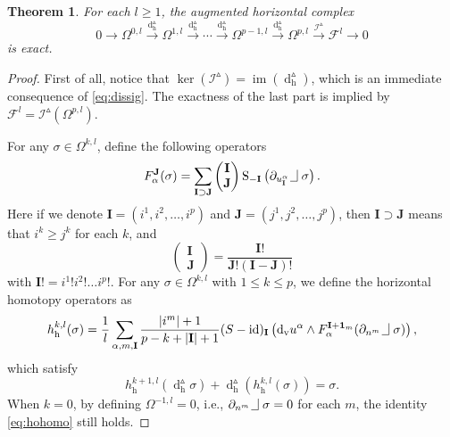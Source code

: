 \documentclass[11pt]{article} %
\numberwithin{equation}{section}
\newcommand{\intpsym}{\,\, \setlength{\unitlength}{0.4mm}
	\begin{picture}(0, 0)(5, 5)%
	\put(0, 4){\line(1,0){5}} \put(5,4){\line(0,1){8}}
	\end{picture}\,\,}
\newcommand{\intp}{\,\,\intpsym}
\newcommand{\es}{\operatorname{S}}
\newcommand{\id}{\operatorname{id}}
\newcommand{\upd}{\operatorname{d}}
\newcommand{\uph}{\operatorname{h}}
\newcommand{\upv}{\operatorname{v}}
\newcommand{\dv}{\upd_{\upv}\!}
\newcommand{\mbI}{\mathbf{I}}
\newcommand{\mbJ}{\mathbf{J}}
\newcommand{\mcI}{\mathcal{I}}
\newcommand{\dDh}{\upd^{\vartriangle}_{\uph}}
\theoremstyle{plain}
\newtheorem{thm}{Theorem}[section]
\theoremstyle{definition}
\begin{document}
\begin{thm}
For each $l\geq1$, the augmented horizontal complex
\begin{equation}
0\rightarrow
\Omega^{0,l}\stackrel{\dDh}{\longrightarrow}
\Omega^{1,l}\stackrel{\dDh}{\longrightarrow}
\cdots\stackrel{\dDh}{\longrightarrow}
\Omega^{p-1,l}\stackrel{\dDh}{\longrightarrow}
\Omega^{p,l}\stackrel{\mcI^{\vartriangle}}{\longrightarrow}
\mathscr{F}^l\rightarrow0 
\end{equation}
is exact.
\end{thm}

\begin{proof}
First of all, notice that $\ker
(\mcI^{\vartriangle})=\operatorname{im}
(\dDh)$, which is an
immediate consequence of \eqref{eq:dissig}. The exactness of the
last part is implied by
$\mathscr{F}^l=\mcI^{\vartriangle}(\Omega^{p,l})$.

For any $\sigma\in\Omega^{k,l}$, define the following operators 
\begin{equation}
F_{\alpha}^{\mbJ}(\sigma)=\sum_{\mbI\supset \mbJ}\begin{pmatrix}
\mbI\\
\mbJ
\end{pmatrix}\es_{-\mbI}\left(\partial_{u_{\mbI}^{\alpha}}\intp\sigma\right).
\end{equation}
Here if we denote $\mbI=(i^1,i^2,\ldots,i^p)$ and $\mbJ=(j^1,j^2,\ldots,j^p)$,
then $\mbI\supset \mbJ$ means that $i^k\geq j^k$ for each $k$, and
\begin{equation}
\begin{pmatrix}
\mbI\\
\mbJ
\end{pmatrix}=\frac{\mbI!}{\mbJ!(\mbI- \mbJ)!}
\end{equation}
 with $\mbI!=i^1!i^2!\ldots i^p!$. 
For any $\sigma\in\Omega^{k,l}$ with $1\leq k\leq p$, we define
the horizontal homotopy operators as
\begin{equation}
h_{\uph}^{k,l}(\sigma)=\frac{1}{l}\sum_{\alpha,m,\mbI}\frac{|i^m|+1}{p-k+|\mbI|+1}(S-\id)_{\mbI}
\left(\dv u^{\alpha}\wedge
F_{\alpha}^{\mbI+\mathbf{1}_m}(\partial_{n^m}\intp\sigma)\right),
\end{equation}
which satisfy
\begin{equation}\label{eq:hohomo}
h_{\uph}^{k+1,l}(\dDh\!\sigma)
+\dDh\left(h_{\uph}^{k,l}(\sigma)\right)=\sigma.
\end{equation} 
When $k=0$, by defining $\Omega^{-1,l}=0$, i.e.,
$\partial_{n^m}\intp\sigma=0$ for each $m$,  the identity \eqref{eq:hohomo} still holds.
\end{proof}
\end{document}
